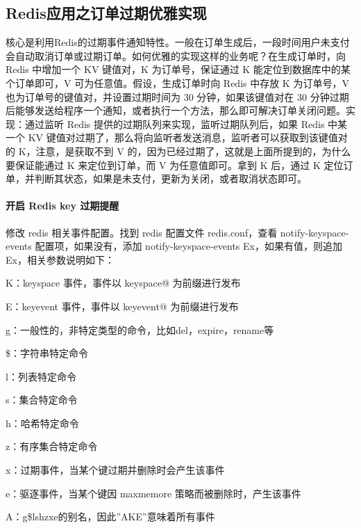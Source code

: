 \documentclass[../../../interview-questions.tex]{subfiles}
\begin{document}
\subsection{Redis应用之订单过期优雅实现}

核心是利用Redis的过期事件通知特性。一般在订单生成后，一段时间用户未支付会自动取消订单或过期订单。如何优雅的实现这样的业务呢？在生成订单时，向 Redis 中增加一个 KV 键值对，K 为订单号，保证通过 K 能定位到数据库中的某个订单即可，V 可为任意值。假设，生成订单时向 Redis 中存放 K 为订单号，V 也为订单号的键值对，并设置过期时间为 30 分钟，如果该键值对在 30 分钟过期后能够发送给程序一个通知，或者执行一个方法，那么即可解决订单关闭问题。实现：通过监听 Redis 提供的过期队列来实现，监听过期队列后，如果 Redis 中某一个 KV 键值对过期了，那么将向监听者发送消息，监听者可以获取到该键值对的 K，注意，是获取不到 V 的，因为已经过期了，这就是上面所提到的，为什么要保证能通过 K 来定位到订单，而 V 为任意值即可。拿到 K 后，通过 K 定位订单，并判断其状态，如果是未支付，更新为关闭，或者取消状态即可。

\paragraph{开启 Redis key 过期提醒}


修改 redis 相关事件配置。找到 redis 配置文件 redis.conf，查看 notify-keyspace-events 配置项，如果没有，添加 notify-keyspace-events Ex，如果有值，则追加 Ex，相关参数说明如下：

K：keyspace 事件，事件以 keyspace@ 为前缀进行发布

E：keyevent 事件，事件以 keyevent@ 为前缀进行发布

g：一般性的，非特定类型的命令，比如del，expire，rename等

\$：字符串特定命令

l：列表特定命令

s：集合特定命令

h：哈希特定命令

z：有序集合特定命令

x：过期事件，当某个键过期并删除时会产生该事件

e：驱逐事件，当某个键因 maxmemore 策略而被删除时，产生该事件

A：g\$lshzxe的别名，因此”AKE”意味着所有事件
\end{document}

